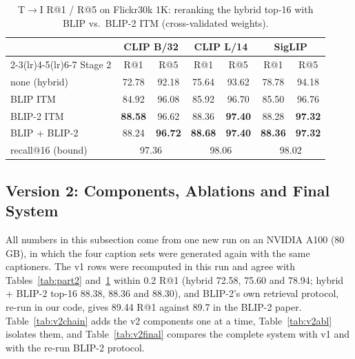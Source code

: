 \documentclass[conference]{IEEEtran}
\newcommand{\RA}{\ensuremath{\rightarrow}}
\newcommand{\best}[1]{\textbf{#1}}
\begin{document}
\begin{table}[t]
\centering
\caption{T\RA I R@1 / R@5 on Flickr30k 1K: reranking the hybrid top-16 with BLIP vs.\ BLIP-2 ITM
(cross-validated weights).}
\label{tab:blip2}
\setlength{\tabcolsep}{3.4pt}
\begin{tabular}{l cc cc cc}
\toprule
& \multicolumn{2}{c}{CLIP B/32} & \multicolumn{2}{c}{CLIP L/14} & \multicolumn{2}{c}{SigLIP} \\
\cmidrule(lr){2-3}\cmidrule(lr){4-5}\cmidrule(lr){6-7}
Stage 2 & R@1 & R@5 & R@1 & R@5 & R@1 & R@5 \\
\midrule
none (hybrid)        & 72.78 & 92.18 & 75.64 & 93.62 & 78.78 & 94.18 \\
BLIP ITM             & 84.92 & 96.08 & 85.92 & 96.70 & 85.50 & 96.76 \\
BLIP-2 ITM           & \best{88.58} & 96.62 & 88.36 & \best{97.40} & 88.28 & \best{97.32} \\
BLIP + BLIP-2        & 88.24 & \best{96.72} & \best{88.68} & \best{97.40} & \best{88.36} & \best{97.32} \\
\midrule
recall@16 (bound)    & \multicolumn{2}{c}{97.36} & \multicolumn{2}{c}{98.06} & \multicolumn{2}{c}{98.02} \\
\bottomrule
\end{tabular}
\end{table}

\subsection{Version 2: Components, Ablations and Final System}
\label{sec:v2res}
All numbers in this subsection come from one new run on an NVIDIA A100 (80\,GB), in which the four caption sets
were generated again with the same captioners. The v1 rows were recomputed in this run and agree with
Tables~\ref{tab:part2} and~\ref{tab:blip2} within 0.2 R@1 (hybrid 72.58, 75.60 and 78.94; hybrid + BLIP-2 top-16
88.38, 88.36 and 88.30), and BLIP-2's own retrieval protocol, re-run in our code, gives 89.44 R@1 against 89.7
in the BLIP-2 paper. Table~\ref{tab:v2chain} adds the v2 components one at a time,
Table~\ref{tab:v2abl} isolates them, and Table~\ref{tab:v2final} compares the complete system with v1 and with the
re-run BLIP-2 protocol.
\end{document}
